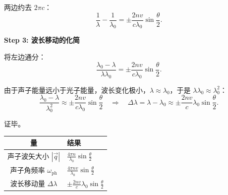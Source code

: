 \begin{derivationbox}[标准解题过程]
两边约去 $2\pi c$：
\begin{equation}
\frac{1}{\lambda} - \frac{1}{\lambda_0} = \pm\frac{2nv}{c\lambda_0}\sin\frac{\theta}{2}.
\end{equation}

\textbf{Step 3: 波长移动的化简}

将左边通分：
\begin{equation}
\frac{\lambda_0 - \lambda}{\lambda\lambda_0} = \pm\frac{2nv}{c\lambda_0}\sin\frac{\theta}{2}.
\end{equation}

由于声子能量远小于光子能量，波长变化极小，$\lambda \approx \lambda_0$，于是 $\lambda\lambda_0 \approx \lambda_0^2$：
\begin{equation}
\frac{\lambda_0 - \lambda}{\lambda_0^2} \approx \pm\frac{2nv}{c\lambda_0}\sin\frac{\theta}{2}
\quad\Longrightarrow\quad
\Delta\lambda = \lambda - \lambda_0 \approx \pm\frac{2nv}{c}\lambda_0\sin\frac{\theta}{2}.
\end{equation}

证毕。
\end{derivationbox}

\begin{formulabox}[答案汇总]
\begin{center}
\begin{tabular}{cl}
\toprule
量 & 结果 \\
\midrule
声子波矢大小 $|\vec q|$ & $\displaystyle \frac{4\pi n}{\lambda_0}\sin\frac{\theta}{2}$ \\[10pt]
声子角频率 $\omega_\mathrm{ph}$ & $\displaystyle \frac{4\pi nv}{\lambda_0}\sin\frac{\theta}{2}$ \\[10pt]
波长移动量 $\Delta\lambda$ & $\displaystyle \pm\frac{2nv}{c}\lambda_0\sin\frac{\theta}{2}$ \\[10pt]
\bottomrule
\end{tabular}
\end{center}
\end{formulabox}

